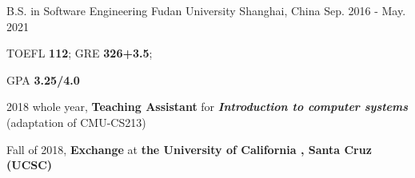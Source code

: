 

\begin{cventries}

  \cventry
    {B.S. in Software Engineering} %
    {Fudan University} %
    {Shanghai, China} %
    {Sep. 2016 - May. 2021} %
    {
      \begin{cvitems} %
      \end{cvitems}

      \begin{cvitems} %
        \item {TOEFL \textbf{112}; GRE \textbf{326+3.5};}
        \item {GPA \textbf{3.25/4.0}}
        \item {2018 whole year,  \textbf{Teaching Assistant} for \textbf{\textit{Introduction to computer systems}} (adaptation of CMU-CS213)}
        \item {Fall of 2018, \textbf{Exchange} at \textbf{the University of California ,  Santa Cruz (UCSC)} }
      \end{cvitems}

    }

\end{cventries}
